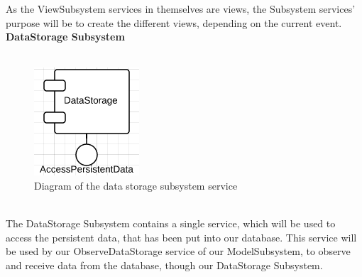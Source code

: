 As the ViewSubsystem services in themselves are views, the Subsystem services' purpose will be to create the different views, depending on the current event.\\

\textbf{DataStorage Subsystem}\\\\
\begin{figure}[h!]
	\centering
		\includegraphics[scale=0.8]{DatastorageServices}
		\caption{Diagram of the data storage subsystem service}
  \label{fig:DataStorageService}
\end{figure}\\
The DataStorage Subsystem contains a single service, which will be used to access the persistent data, that has been put into our database. This service will be used by our ObserveDataStorage service of our ModelSubsystem, to observe and receive data from the database, though our DataStorage Subsystem.